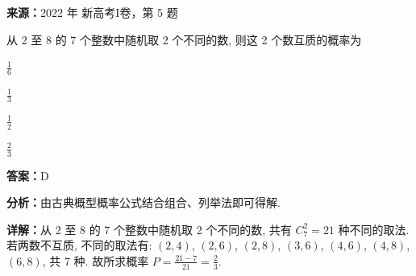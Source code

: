 \begin{question}[points=5]
\textbf{来源：}2022 年 新高考I卷，第 5 题\par
从 2 至 8 的 7 个整数中随机取 2 个不同的数, 则这 2 个数互质的概率为
\begin{choices}
  \item $\frac{1}{6}$
  \item $\frac{1}{3}$
  \item $\frac{1}{2}$
  \item $\frac{2}{3}$
\end{choices}
\begin{solution}
\textbf{答案：}D

\textbf{分析：}由古典概型概率公式结合组合、列举法即可得解.

\textbf{详解：}从 2 至 8 的 7 个整数中随机取 2 个不同的数, 共有 $C_7^2 = 21$ 种不同的取法. 若两数不互质, 不同的取法有: $(2,4)$, $(2,6)$, $(2,8)$, $(3,6)$, $(4,6)$, $(4,8)$, $(6,8)$, 共 7 种. 故所求概率 $P = \frac{21 - 7}{21} = \frac{2}{3}$.
\end{solution}
\end{question}

